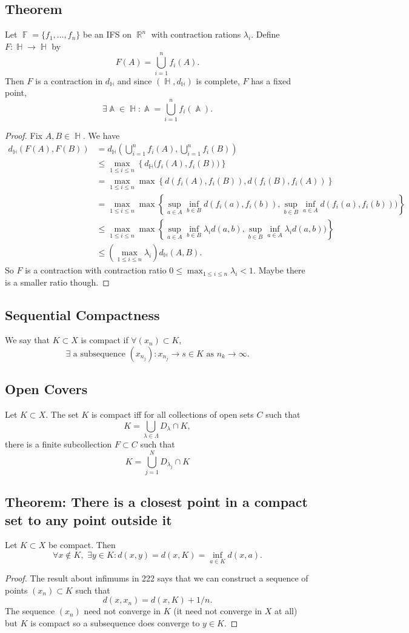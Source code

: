 \documentclass{article}
\DeclareMathOperator\R{\mathbb{R}}
\DeclareMathOperator\F{\mathbb{F}}
\DeclareMathOperator\A{\mathbb{A}}
\DeclareMathOperator\HH{\mathbb{H}}
\begin{document}
\subsection*{Theorem}
Let $\F = \{f_1,\hdots,f_n \}$ be an IFS on $\R^n$ with contraction rations $\lambda_i$.
Define $F: \HH \to \HH$ by $$
F(A) = \bigcup_{i=1}^n f_i(A).
$$
Then $F$ is a contraction in $d_{\HH}$ and since $(\HH,d_{\HH})$ is complete, $F$ has a fixed point, $$
\exists \A \in \HH: \A = \bigcup_{i=1}^n f_i(\A).
$$
\begin{proof}
Fix $A,B \in \HH$.
We have \begin{align*}
d_{\HH}\left( F(A),F(B) \right) &= d_{\HH}\left( \bigcup_{i=1}^n f_i(A) , \bigcup_{i=1}^n f_i(B) \right) \\
& \leq \max_{1 \leq i \leq n} \left \{ d_{\HH} \big( f_i(A), f_i(B) \big) \right \} \\
& = \max_{1 \leq i \leq n} \max \left \{ d(f_i(A),f_i(B)) , d(f_i(B),f_i(A))   \right \}
\\
&= \max_{1 \leq i \leq n} \max \left \{ \sup_{a \in A} \inf_{b \in B} d(f_i(a),f_i(b)) , \sup_{b \in B} \inf_{a \in A} d(f_i(a),f_i(b)) ) \right \} \\
& \leq \max_{1 \leq i \leq n} \max \left \{ \sup_{a \in A} \inf_{b \in B} \lambda_i d(a,b) , \sup_{b \in B} \inf_{a \in A} \lambda_i d(a,b) ) \right \} \\
&  \leq \left( \max_{1 \leq i \leq n} \lambda_i \right) d_{\HH}(A,B).
\end{align*}
So $F$ is a contraction with contraction ratio $ 0 \leq \max_{1 \leq i \leq n} \lambda_i < 1$. Maybe there is a smaller ratio though.
\end{proof}
\subsection*{Sequential Compactness}
We say that $K \subset X$ is compact if $\forall (x_n) \subset K$, $$
\exists \text{ a subsequence } (x_{n_j}): x_{n_j} \to s \in K \text{ as } n_k \to \infty.
$$
\subsection*{Open Covers}
Let $K \subset X$. The set $K$ is compact iff
for all collections of open sets $C$ such that $$
K = \bigcup_{\lambda \in \Lambda} D_{\lambda} \cap K,
$$
there is a finite subcollection $F \subset C$ such that $$
K = \bigcup_{j=1}^N D_{\lambda_j} \cap K
$$
\subsection*{Theorem: There is a closest point in a compact set to any point outside it}
Let $K \subset X$ be compact. Then $$
\forall x \not \in K, \,\, \exists y \in K: d(x,y) = d(x,K) = \inf_{a \in K}  d(x,a) .
$$
\begin{proof}
The result about infimums in 222 says that we can
construct a sequence of points $(x_n) \subset K$
such that $$
d(x,x_n) = d(x,K) + 1 \slash n.
$$
The sequence $(x_n)$ need not converge in $K$ (it need not converge in $X$ at all) but $K$ is compact so a subsequence does converge to $y \in K$.
\end{proof}
\end{document}
